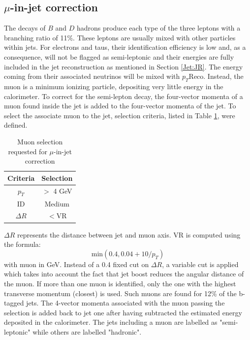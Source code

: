 \subsection{$\mu$-in-jet correction}
\label{Jet:Cal:BCal:MuInJet}
The decays of $B$ and $D$ hadrons produce each type of the three leptons with a branching ratio of 11\%. These leptons are usually mixed with other particles within jets. For electrons and taus, their identification efficiency is low and, as a consequence, will not be flagged as semi-leptonic and their energies are fully included in the jet reconstruction as mentioned in Section \ref{Jet:JR}. The energy coming from their associated neutrinos will be mixed with $p_T$Reco. Instead, the muon is a minimum ionizing particle, depositing very little energy in the calorimeter. To correct for the semi-lepton decay, the four-vector momenta of a muon found inside the jet is added to the four-vector momenta of the jet. To select the associate muon to the jet, selection criteria, listed in Table \ref{tab:Jet:Cal:BCal:MuInJet:Sel}, were defined.
\begin{table}[htbp]
    \centering
    \begin{tabular}{cc}
       \hline\hline
        Criteria & Selection \\
        \hline
        $p_T$ & $>$ 4 GeV \\
         ID & Medium \\
         $\Delta R$ &  $<$VR\\
         \hline
         \hline
    \end{tabular}
    \caption{Muon selection requested for $\mu$-in-jet correction}
    \label{tab:Jet:Cal:BCal:MuInJet:Sel}
\end{table}
$\Delta R$ represents the distance between jet and muon axis. VR is computed using the formula:
\begin{equation}
    \mathrm{min}(0.4, 0.04+10/p_T)
\end{equation}
with muon \pT in GeV. Instead of a 0.4 fixed cut on $\Delta R$, a variable cut is applied which takes into account the fact that jet boost reduces the angular distance of the muon. If more than one muon is identified, only the one with the highest transverse momentum (closest) is used. Such muons are found for 12\% of the b-tagged jets. The 4-vector momenta associated with the muon passing the selection is added back to jet one after having subtracted the estimated energy deposited in the calorimeter. The jets including a muon are labelled as "semi-leptonic" while others are labelled "hadronic".

